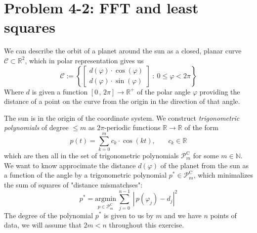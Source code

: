 \documentclass{article}
\begin{document}
\section{Problem 4-2: FFT and least squares}
We can describe the orbit of a planet around the sun as a closed, planar curve $\mathcal{C} \subset \mathbb{R}^{2}$, which in polar representation gives us
\begin{equation*}
    \mathcal{C} := \left\{
    \begin{bmatrix}
    d\left(\varphi\right) \cdot \cos\left(\varphi\right) \\
    d\left(\varphi\right) \cdot \sin\left(\varphi\right)
    \end{bmatrix} 
    \: : \: 0 \leq \varphi < 2\pi \right\}
\end{equation*}
Where $d$ is given a function $\left[0 \,,\, 2\pi\right] \to \mathbb{R}^{+}$ of the polar angle $\varphi$ providing the distance of a point on the curve from the origin in the direction of that angle.

\vspace{2ex}

\noindent The sun is in the origin of the coordinate system. We construct \textit{trigonometric polynomials} of degree $\leq m$ as $2\pi\text{-periodic}$ functions $\mathbb{R} \to \mathbb{R}$ of the form
\begin{equation*}
    p\left(t\right) = \sum_{k=0}^{m}c_{k} \cdot \cos\left(kt\right) \text{,} \qquad c_{k} \in \mathbb{R}
\end{equation*}
which are then all in the set of trigonometric polynomials $\mathcal{P}^{\mathrm{C}}_{m}$ for some $m \in \mathbb{N}$. We want to know approcimate the distance $d\left(\varphi\right)$ of the planet from the sun as a function of the angle by a trigonometric polynomial $p^{*} \in \mathcal{P}^{\mathrm{C}}_{m}$, which minimalizes the sum of squares of "distance mismatchses":
\begin{equation}
    p^{*} = \underset{p \in \mathcal{P}^{\mathrm{C}}_{m}}{\text{argmin}} \: \sum_{j=0}^{n-1} \: \left\lvert \, p\left(\varphi_{j}\right) - d_{j}\right\rvert^{2} 
\end{equation}
The degree of the polynomial $p^{*}$ is given to us by $m$ and we have $n$ points of data, we will assume that $2m < n$ throughout this exercise. 
\end{document}
